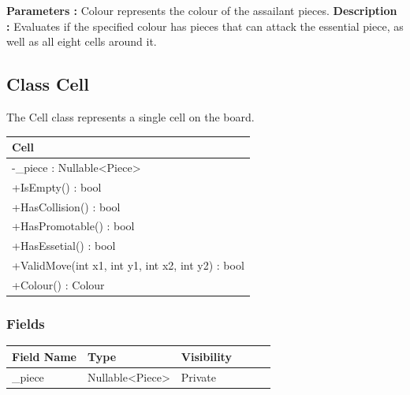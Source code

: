 \documentclass[12pt]{article}
\begin{document}
    \textbf{Parameters :}  Colour represents the colour of the assailant pieces.
    \textbf{Description :} Evaluates if the specified colour has pieces that can attack the essential piece, as well as all eight cells around it.

    \newpage


    \subsection{Class Cell}

    The Cell class represents a single cell on the board.

    \begin{table}[H]
        \begin{tabular}{|l|}
            \hline
            \rowcolor[HTML]{C0C0C0}
            \textbf{Cell}                                     \\ \hline
            \rowcolor[HTML]{EFEFEF}
            -\_piece : Nullable\textless{}Piece\textgreater{} \\ \hline
            +IsEmpty() : bool                                 \\ \hline
            +HasCollision() : bool                            \\ \hline
            +HasPromotable() : bool                           \\ \hline
            +HasEssetial() : bool                             \\ \hline
            +ValidMove(int x1, int y1, int x2, int y2) : bool \\ \hline
            +Colour() : Colour                                \\ \hline
        \end{tabular}
    \end{table}

    \subsubsection{Fields}

    \begin{table}[H]
        \begin{tabular}{llllll}
            \hline
            \multicolumn{1}{|l|}{\cellcolor[HTML]{EFEFEF}\textbf{Field Name}} & \multicolumn{1}{l|}{\cellcolor[HTML]{EFEFEF}\textbf{Type}} & \multicolumn{1}{l|}{\cellcolor[HTML]{EFEFEF}\textbf{Visibility}} \\ \hline
            \multicolumn{1}{|l|}{\_piece}                                     & \multicolumn{1}{l|}{Nullable\textless{}Piece\textgreater{}}                       & \multicolumn{1}{l|}{Private}                                     \\ \hline
        \end{tabular}
    \end{table}
\end{document}
